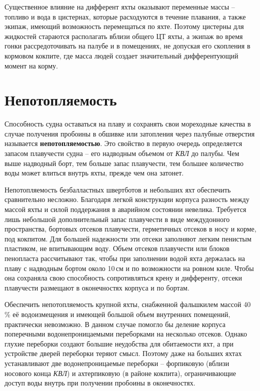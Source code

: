 Существенное влияние на дифферент яхты оказывают переменные массы \---
топливо и вода в цистернах, которые расходуются в течение плавания, а
также экипаж, имеющий возможность перемещаться по яхте. Поэтому
цистерны для жидкостей стараются располагать вблизи общего ЦТ яхты, а
экипаж во время гонки рассредоточивать на палубе и в помещениях, не
допуская его скопления в кормовом кокпите, где масса людей создает
значительный дифферентующий момент на корму.

\section{Непотопляемость}

Способность судна оставаться на плаву и сохранять свои мореходные
качества в случае получения пробоины в обшивке или затопления через
палубные отверстия называется
\textbf{непотопляемостью}. Это свойство в
первую очередь определяется запасом плавучести судна \--- его
надводным объемом от \textit{КВЛ} до палубы. Чем выше надводный борт,
тем больше запас плавучести, тем большее количество воды может влиться
внутрь яхты, прежде чем она затонет.

Непотопляемость безбалластных швертботов и небольших яхт обеспечить
сравнительно несложно. Благодаря легкой конструкции корпуса разность
между массой яхты и силой поддержания в аварийном состоянии
невелика. Требуется лишь небольшой дополнительный запас плавучести в
виде междудонного пространства, бортовых отсеков плавучести,
герметичных отсеков в носу и корме, под кокпитом. Для большей
надежности эти отсеки заполняют легким пенистым пластиком, не
впитывающим воду. Объем отсеков плавучести или блоков пенопласта
рассчитывают так, чтобы при заполнении водой яхта держалась на плаву с
надводным бортом около 10\,см и по возможности на ровном киле. Чтобы
она сохраняла свою способность сопротивляться крену и дифференту,
отсеки плавучести размещают в оконечностях корпуса и по бортам.

Обеспечить непотопляемость крупной яхты, снабженной фальшкилем массой
40\,\% её водоизмещения и имеющей большой объем внутренних
помещений, практически невозможно. В данном случае помогло бы деление
корпуса поперечными водонепроницаемыми переборками на несколько
отсеков. Однако глухие переборки создают большие неудобства для
обитаемости яхт, а при устройстве дверей переборки теряют
смысл. Поэтому даже на больших яхтах устанавливают две
водонепроницаемые переборки \--- форпиковую (вблизи носового конца
\textit{КВЛ}) и ахтерпиковую (в районе кокпита), ограничивающие доступ
воды внутрь при получении пробоины в оконечностях.

